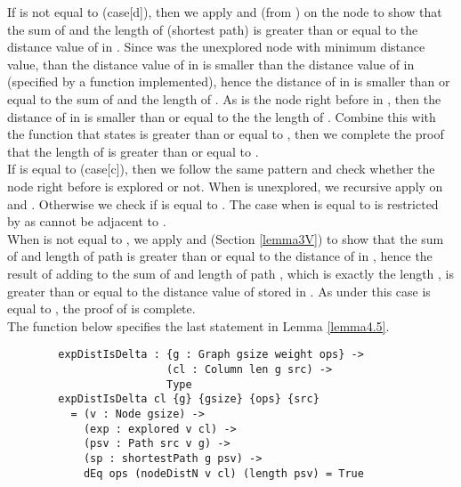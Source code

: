 If  is not equal to (case[d]), then we apply  and (from ) on the node  to show that the sum of  and the length of  (shortest  path) is greater than or equal to the distance value of  in . Since  was the unexplored node with minimum distance value, than the distance value of  in  is smaller than the distance value of  in (specified by a  function implemented), hence the distance of  in  is smaller than or equal to the sum of  and the length of . As  is the node right before  in , then the distance of  in  is smaller than or equal to the the length of . Combine this with the function  that states  is greater than or equal to , then we complete the proof that the length of  is greater than or equal to . 
\\

If  is equal to (case[c]), then we follow the same pattern and check whether the node  right before  is explored or not. When  is unexplored, we recursive apply  on  and . Otherwise we check if  is equal to . The case when  is equal to  is restricted by  as  cannot be adjacent to . 
\\

When  is not equal to , we apply  and  (Section \ref{lemma3V}) to show that the sum of  and length of path  is greater than or equal to the distance of  in , hence the result of adding  to the sum of  and length of path , which is exactly the length , is greater than or equal to the distance value of  stored in . As under this case  is equal to , the proof of  is complete. 
\\

The function  below specifies the last statement in Lemma \ref{lemma4.5}. 
\begin{lstlisting}
		expDistIsDelta : {g : Graph gsize weight ops} ->
		                 (cl : Column len g src) ->
		                 Type
		expDistIsDelta cl {g} {gsize} {ops} {src}
		  = (v : Node gsize) ->
		    (exp : explored v cl) ->
		    (psv : Path src v g) ->
		    (sp : shortestPath g psv) ->
		    dEq ops (nodeDistN v cl) (length psv) = True
\end{lstlisting}

